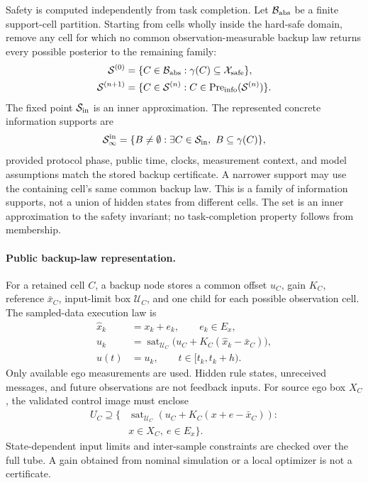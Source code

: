 \documentclass[letterpaper]{article} %
\begin{document}
Safety is computed independently from task completion. Let $\mathcal B_{\rm abs}$ be a finite support-cell partition. Starting from cells wholly inside the hard-safe domain, remove any cell for which no common observation-measurable backup law returns every possible posterior to the remaining family:
\begin{equation}
\begin{aligned}
\mathcal S^{(0)}&=\{C\in\mathcal B_{\rm abs}:
\gamma(C)\subseteq\mathcal X_{\rm safe}\},\\
\mathcal S^{(n+1)}&=\{C\in\mathcal S^{(n)}:
C\in\operatorname{Pre}_{\rm info}(\mathcal S^{(n)})\}.
\end{aligned}
\label{eq:info-invariant-iteration}
\end{equation}
The fixed point $\mathcal S_{\rm in}$ is an inner approximation. The represented concrete information supports are
\begin{equation}
\mathcal S_\infty^{\rm in}=
\{B\ne\emptyset:\exists C\in\mathcal S_{\rm in},\
B\subseteq\gamma(C)\},
\label{eq:invariant-downward-closure}
\end{equation}
provided protocol phase, public time, clocks, measurement context, and model assumptions match the stored backup certificate. A narrower support may use the containing cell's same common backup law. This is a family of information supports, not a union of hidden states from different cells. The set is an inner approximation to the safety invariant; no task-completion property follows from membership.

\paragraph{Public backup-law representation.}
For a retained cell $C$, a backup node stores a common offset $u_C$, gain $K_C$, reference $\bar x_C$, input-limit box $\mathcal U_C$, and one child for each possible observation cell. The sampled-data execution law is
\begin{equation}
\begin{aligned}
\hat x_k&=x_k+e_k,\qquad e_k\in E_x,\\
u_k&=\operatorname{sat}_{\mathcal U_C}
 \big(u_C+K_C(\hat x_k-\bar x_C)\big),\\
u(t)&=u_k,\qquad t\in[t_k,t_k+h).
\end{aligned}
\label{eq:sampled-public-backup}
\end{equation}
Only available ego measurements are used. Hidden rule states, unreceived messages, and future observations are not feedback inputs. For source ego box $X_C$, the validated control image must enclose
\begin{equation}
\begin{aligned}
U_C\supseteq\{&
\operatorname{sat}_{\mathcal U_C}
(u_C+K_C(x+e-\bar x_C)):\\
&x\in X_C,\ e\in E_x\}.
\end{aligned}
\label{eq:public-control-image}
\end{equation}
State-dependent input limits and inter-sample constraints are checked over the full tube. A gain obtained from nominal simulation or a local optimizer is not a certificate.
\end{document}
